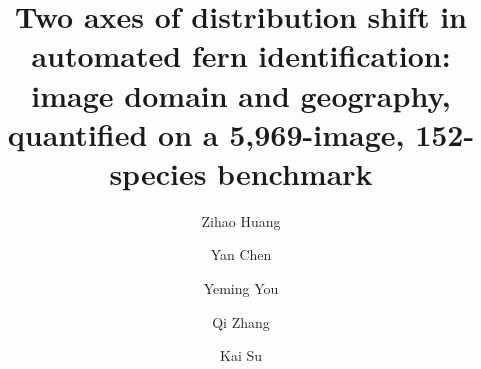 \documentclass[preprint,12pt,authoryear]{elsarticle}
\begin{document}
\begin{frontmatter}

\title{Two axes of distribution shift in automated fern identification: image domain and geography, quantified on a 5,969-image, 152-species benchmark\tnotemark[1]}

\author[a,b]{Zihao Huang}
\author[a,b]{Yan Chen}
\author[c]{Yeming You}
\author[d]{Qi Zhang}
\author[c]{Kai Su}


\address[a]{Guangxi Key Laboratory of Digital Infrastructure, Guangxi Zhuang Autonomous Region Information Center, Nanning 530000, China}
\address[b]{School of Computer and Electronic Information, Guangxi University, Nanning 530000, China}
\address[c]{Guangxi Colleges and Universities Key Laboratory for Cultivation and Utilization of Subtropical Forest Plantation, Key Laboratory of National Forestry and Grassland Administration on Cultivation of Fast-Growing Timber in Central South China, School of Forestry, Guangxi University, Nanning 530004, China}
\address[d]{China Post Group Co., Ltd. Nanning Branch, Nanning 530000, China}



\end{frontmatter}
\end{document}
